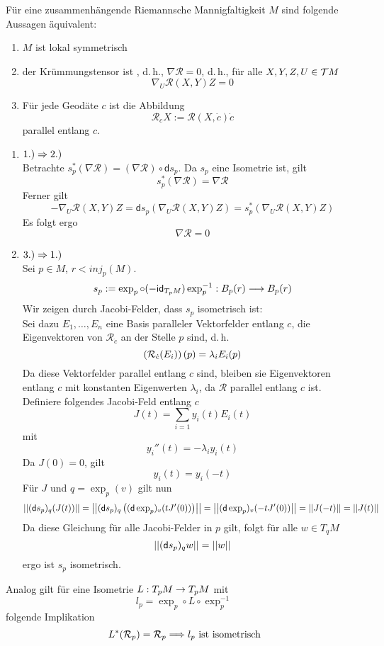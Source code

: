 \documentclass{book}
\renewcommand{\i}{^{-1}}
\renewcommand{\d}{\textsf{d}}
\newcommand{\Rc}{\mathcal{R}}
\begin{document}
\Satz{}
\label{180117}
Für eine zusammenhängende Riemannsche Mannigfaltigkeit $M$ sind folgende Aussagen äquivalent:
\begin{enumerate}[1.)]
\item $M$ ist lokal symmetrisch
\item der Krümmungstensor ist , d.\,h., $\nabla \Rc = 0$, d.\,h., für alle $X,Y,Z,U \in \mathcal{T} M$
\[ \nabla_U \Rc(X,Y)Z = 0 \]
\item Für jede Geodäte $c$ ist die Abbildung
\[ \Rc_{\dot{c}}X := \Rc(X, \dot{c})\dot{c} \]
parallel entlang $c$.
\end{enumerate}
\begin{Beweis}{}
\begin{enumerate}
\item $1.) \overset{}{\Rightarrow} 2.)$\\
Betrachte $s_p^*(\nabla \Rc) = (\nabla \Rc) \circ \d s_p$. Da $s_p$ eine Isometrie ist, gilt
\[ s_p^*(\nabla \Rc) = \nabla \Rc \]
Ferner gilt
\[ - \nabla_U \Rc(X,Y) Z = \d s_p (\nabla_U \Rc(X,Y) Z) = s_p^*(\nabla_U \Rc(X,Y) Z) \]
Es folgt ergo
\[ \nabla \Rc = 0 \]
\item $3.) \overset{}{\Rightarrow} 1.)$\\
Sei $p \in M$, $r < inj_p(M)$.
\[ s_p := \exp_p \circ (-\id{T_pM}) \exp_p\i : B_p(r) \Pfeil{} B_p(r) \]
Wir zeigen durch Jacobi-Felder, dass $s_p$ isometrisch ist:\\
Sei dazu $E_1, \ldots, E_n$ eine Basis paralleler Vektorfelder entlang $c$, die Eigenvektoren von $\Rc_{\dot{c}}$ an der Stelle $p$ sind, d.\,h.
\[ \klam{\Rc_{\dot{c}}(E_i)} (p) = \lambda_i E_i(p) \]
Da diese Vektorfelder parallel entlang $c$ sind, bleiben sie Eigenvektoren entlang $c$ mit konstanten Eigenwerten $\lambda_i$, da $\Rc$ parallel entlang $c$ ist. Definiere folgendes Jacobi-Feld entlang $c$
\[ J(t) = \sum_{i = 1} y_i(t) E_i(t) \]
mit
\[ y_i''(t) = - \lambda_i y_i(t) \]
Da $J(0) = 0$, gilt
\[ y_i(t) = y_i(-t) \]
Für $J$ und $q = \exp_p(v)$ gilt nun
\[ \norm{ (\d s_p)_q (J(t)) } = \norm{ (\d s_p)_q \klam{ (\d \exp_p)_v (tJ'(0)) } } = \norm{ (\d \exp_p)_v (-tJ'(0)) } = \norm{J(-t)} = \norm{J(t)}  \]
Da diese Gleichung für alle Jacobi-Felder in $p$ gilt, folgt für alle $w \in T_qM$
\[ \norm{(\d s_p)_q w} = \norm{w} \]
ergo ist $s_p$ isometrisch.
\end{enumerate}
\end{Beweis}

\Bem{}
Analog gilt für eine Isometrie $L : T_pM \overset{}{\rightarrow} T_pM$ mit
\[l_p = \exp_p \circ L \circ \exp_p\i \]
folgende Implikation
\[ L^*(\Rc_p) = \Rc_p \Impl{} l_p \text{ ist isometrisch} \] %
\end{document}
